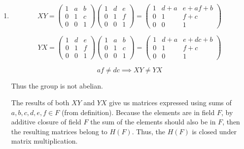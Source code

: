 \documentclass[12pt]{article}
\begin{document}
\begin{solution}
\bbni 
    \begin{enumerate}
        \item
        \[ XY = \begin{pmatrix}
            1 & a & b \\ 0 & 1 & c \\ 0 & 0 & 1
        \end{pmatrix} \begin{pmatrix}
            1 & d & e \\ 0 & 1 & f \\ 0 & 0 & 1
        \end{pmatrix} = \begin{pmatrix}
            1 & d + a & e + af + b \\ 0 & 1 & f+c \\ 0 & 0 & 1
        \end{pmatrix}
        \]

        
        \[ YX = \begin{pmatrix}
            1 & d & e \\ 0 & 1 & f \\ 0 & 0 & 1
        \end{pmatrix}\begin{pmatrix}
            1 & a & b \\ 0 & 1 & c \\ 0 & 0 & 1
        \end{pmatrix} = \begin{pmatrix}
            1 & d + a & e + dc + b \\ 0 & 1 & f+c \\ 0 & 0 & 1
        \end{pmatrix}
        \]

        \[af \neq dc \implies XY \neq YX\]

        Thus the group is not abelian. 

        The results of both $XY$ and $YX$ give us matrices expressed using sums of $a, b, c, d, e, f \in F$ (from definition). Because the elements are in field $F$, by additive closure of field $F$ the sum of the elements should also be in $F$, then the resulting matrices belong to $H(F)$. Thus, the $H(F)$ is closed under matrix multiplication. 


\end{enumerate}
\end{solution}
\end{document}
